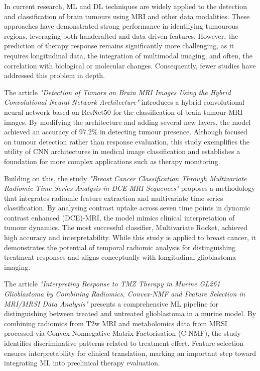 \documentclass[12pt, a4paper]{report}
\begin{document}
In current research, ML and DL techniques are widely applied to the detection and classification of brain tumours using MRI and other data modalities. These approaches have demonstrated strong performance in identifying tumourous regions, leveraging both handcrafted and data-driven features. However, the prediction of therapy response remains significantly more challenging, as it requires longitudinal data, the integration of multimodal imaging, and often, the correlation with biological or molecular changes. Consequently, fewer studies have addressed this problem in depth. 

The article \textit{"Detection of Tumors on Brain MRI Images Using the Hybrid Convolutional Neural Network Architecture"}  \cite{Cinar2020} introduces a hybrid convolutional neural network based on ResNet50 for the classification of brain tumour MRI images. By modifying the architecture and adding several new layers, the model achieved an accuracy of 97.2\% in detecting tumour presence. Although focused on tumour detection rather than response evaluation, this study exemplifies the utility of CNN architectures in medical image classification and establishes a foundation for more complex applications such as therapy monitoring.

Building on this, the study \textit{"Breast Cancer Classification Through Multivariate Radiomic Time Series Analysis in DCE-MRI Sequences"} \cite{Prinzi2024} proposes a methodology that integrates radiomic feature extraction and multivariate time series classification. By analysing contrast uptake across seven time points in dynamic contrast enhanced (DCE)-MRI, the model mimics clinical interpretation of tumour dynamics. The most successful classifier, Multivariate Rocket, achieved high accuracy and interpretability. While this study is applied to breast cancer, it demonstrates the potential of temporal radiomic analysis for distinguishing treatment responses and aligns conceptually with longitudinal glioblastoma imaging.

The article \textit{"Interpreting Response to TMZ Therapy in Murine GL261 Glioblastoma by Combining Radiomics, Convex-NMF and Feature Selection in MRI/MRSI Data Analysis"} \cite{interpretingLuisMiguel} presents a comprehensive ML pipeline for distinguishing between treated and untreated glioblastoma in a murine model. By combining radiomics from T2w MRI and metabolomics data from MRSI processed via Convex-Nonnegative Matrix Factorisation (C-NMF), the study identifies discriminative patterns related to treatment effect. Feature selection ensures interpretability for clinical translation, marking an important step toward integrating ML into preclinical therapy evaluation.
\end{document}
